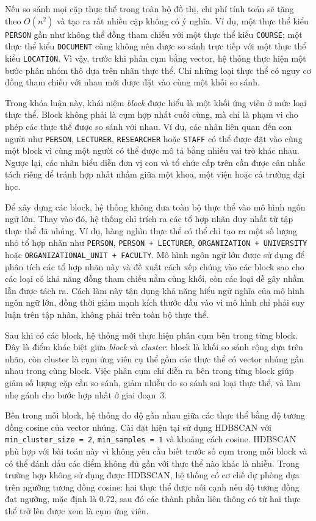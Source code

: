 Nếu so sánh mọi cặp thực thể trong toàn bộ đồ thị, chi phí tính toán sẽ tăng theo $O(n^2)$ và tạo ra rất nhiều cặp không có ý nghĩa. Ví dụ, một thực thể kiểu \texttt{PERSON} gần như không thể đồng tham chiếu với một thực thể kiểu \texttt{COURSE}; một thực thể kiểu \texttt{DOCUMENT} cũng không nên được so sánh trực tiếp với một thực thể kiểu \texttt{LOCATION}. Vì vậy, trước khi phân cụm bằng vector, hệ thống thực hiện một bước phân nhóm thô dựa trên nhãn thực thể. Chỉ những loại thực thể có nguy cơ đồng tham chiếu với nhau mới được đặt vào cùng một khối so sánh.

Trong khóa luận này, khái niệm \textit{block} được hiểu là một khối ứng viên ở mức loại thực thể. Block không phải là cụm hợp nhất cuối cùng, mà chỉ là phạm vi cho phép các thực thể được so sánh với nhau. Ví dụ, các nhãn liên quan đến con người như \texttt{PERSON}, \texttt{LECTURER}, \texttt{RESEARCHER} hoặc \texttt{STAFF} có thể được đặt vào cùng một block vì cùng một người có thể được mô tả bằng nhiều vai trò khác nhau. Ngược lại, các nhãn biểu diễn đơn vị con và tổ chức cấp trên cần được cân nhắc tách riêng để tránh hợp nhất nhầm giữa một khoa, một viện hoặc cả trường đại học.

Để xây dựng các block, hệ thống không đưa toàn bộ thực thể vào mô hình ngôn ngữ lớn. Thay vào đó, hệ thống chỉ trích ra các tổ hợp nhãn duy nhất từ tập thực thể đã nhúng. Ví dụ, hàng nghìn thực thể có thể chỉ tạo ra một số lượng nhỏ tổ hợp nhãn như \texttt{PERSON}, \texttt{PERSON + LECTURER}, \texttt{ORGANIZATION + UNIVERSITY} hoặc \texttt{ORGANIZATIONAL\_UNIT + FACULTY}. Mô hình ngôn ngữ lớn được sử dụng để phân tích các tổ hợp nhãn này và đề xuất cách xếp chúng vào các block sao cho các loại có khả năng đồng tham chiếu nằm cùng khối, còn các loại dễ gây nhầm lẫn được tách ra. Cách làm này tận dụng khả năng hiểu ngữ nghĩa của mô hình ngôn ngữ lớn, đồng thời giảm mạnh kích thước đầu vào vì mô hình chỉ phải suy luận trên tập nhãn, không phải trên toàn bộ thực thể.

Sau khi có các block, hệ thống mới thực hiện phân cụm bên trong từng block. Đây là điểm khác biệt giữa \textit{block} và \textit{cluster}: block là khối so sánh rộng dựa trên nhãn, còn cluster là cụm ứng viên cụ thể gồm các thực thể có vector nhúng gần nhau trong cùng block. Việc phân cụm chỉ diễn ra bên trong từng block giúp giảm số lượng cặp cần so sánh, giảm nhiễu do so sánh sai loại thực thể, và làm nhẹ gánh cho bước hợp nhất ở giai đoạn~3.

Bên trong mỗi block, hệ thống đo độ gần nhau giữa các thực thể bằng độ tương đồng cosine của vector nhúng. Cài đặt hiện tại sử dụng HDBSCAN với \texttt{min\_cluster\_size = 2}, \texttt{min\_samples = 1} và khoảng cách cosine. HDBSCAN phù hợp với bài toán này vì không yêu cầu biết trước số cụm trong mỗi block và có thể đánh dấu các điểm không đủ gần với thực thể nào khác là nhiễu. Trong trường hợp không sử dụng được HDBSCAN, hệ thống có cơ chế dự phòng dựa trên ngưỡng tương đồng cosine: hai thực thể được nối cạnh nếu độ tương đồng đạt ngưỡng, mặc định là 0.72, sau đó các thành phần liên thông có từ hai thực thể trở lên được xem là cụm ứng viên.

